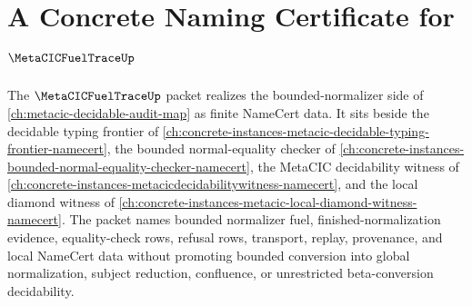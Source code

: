 \chapter{A Concrete Naming Certificate for $\MetaCICFuelTraceUp$}
\label{ch:concrete-instances-metacic-fuel-trace-namecert}

The $\MetaCICFuelTraceUp$ packet realizes the bounded-normalizer side of \autoref{ch:metacic-decidable-audit-map} as finite NameCert data. It sits beside the decidable typing frontier of \autoref{ch:concrete-instances-metacic-decidable-typing-frontier-namecert}, the bounded normal-equality checker of \autoref{ch:concrete-instances-bounded-normal-equality-checker-namecert}, the MetaCIC decidability witness of \autoref{ch:concrete-instances-metacicdecidabilitywitness-namecert}, and the local diamond witness of \autoref{ch:concrete-instances-metacic-local-diamond-witness-namecert}. The packet names bounded normalizer fuel, finished-normalization evidence, equality-check rows, refusal rows, transport, replay, provenance, and local NameCert data without promoting bounded conversion into global normalization, subject reduction, confluence, or unrestricted beta-conversion decidability.




